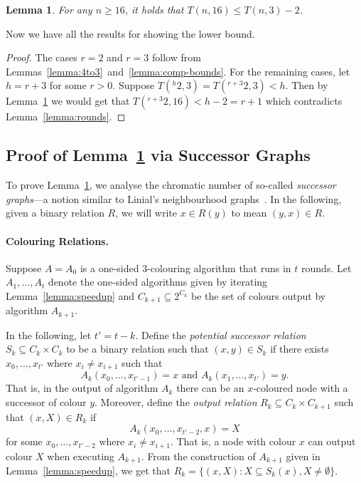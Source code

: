 \documentclass[a4paper,11pt]{article}
\newtheorem{lemma}[theorem]{Lemma}
\theoremstyle{remark}
\newcommand{\pt}[1]{{}^{#1}2} \newcommand{\nh}{\sim} \DeclareMathOperator{\indeg}{in-deg}
\begin{document}
\begin{lemma}
\label{lemma:16-cols}
For any $n \ge 16$, it holds that $T(n,16) \le T(n, 3) - 2$.
\end{lemma}

Now we have all the results for showing the lower bound.

\lbthm*
\begin{proof}
 The cases $r = 2$ and $r = 3$ follow from Lemmas~\ref{lemma:4to3}~and~\ref{lemma:comp-bounds}. For the remaining cases, let $h = r+3$ for some $r > 0$. Suppose $T(\pt{h}, 3) = T(\pt{r+3}, 3) < h$. Then by Lemma~\ref{lemma:16-cols} we would get that $T(\pt{r+3}, 16) < h-2 = r+1$ which contradicts Lemma~\ref{lemma:rounds}.
\end{proof}

\subsection{Proof of Lemma~\ref{lemma:16-cols} via Successor Graphs}

To prove Lemma~\ref{lemma:16-cols}, we analyse the chromatic number of so-called \emph{successor graphs}---a notion similar to Linial's neighbourhood graphs~\cite{linial92locality}. In the following, given a binary relation $R$, we will write $x \in R(y)$ to mean $(y,x) \in R$.

\paragraph{Colouring Relations.}

Suppose $A = A_0$ is a one-sided $3$-colouring algorithm that runs in $t$ rounds. Let $A_1, \dots, A_t$ denote the one-sided algorithms given by iterating Lemma~\ref{lemma:speedup} and $C_{k+1} \subseteq 2^{C_k}$ be the set of colours output by algorithm $A_{k+1}$.

In the following, let $t' = t-k$. Define the \emph{potential successor relation} $S_k \subseteq C_k \times C_k$ to be a binary relation such that $(x,y) \in S_k$ if there exists $x_0, \dots, x_{t'}$ where $x_{i} \neq x_{i+1}$ such that 
\[
 A_k(x_0, \dots, x_{t'-1}) = x \text{ and } A_k(x_1, \dots, x_{t'}) = y.
\]
That is, in the output of algorithm $A_k$ there can be an $x$-coloured node with a successor of colour $y$. Moreover, define the \emph{output relation} $R_k \subseteq C_k \times C_{k+1}$ such that $(x,X) \in R_k$ if 
\[
 A_k(x_0, \dots, x_{t'-2}, x) = X
\]
for some $x_0, \dots, x_{t'-2}$ where $x_{i} \neq x_{i+1}$. That is, a node with colour $x$ can output colour $X$ when executing $A_{k+1}$. From the construction of $A_{k+1}$ given in Lemma~\ref{lemma:speedup}, we get that $R_k = \{ (x,X) : X \subseteq S_k(x), X \neq \emptyset \}$.
\end{document}
